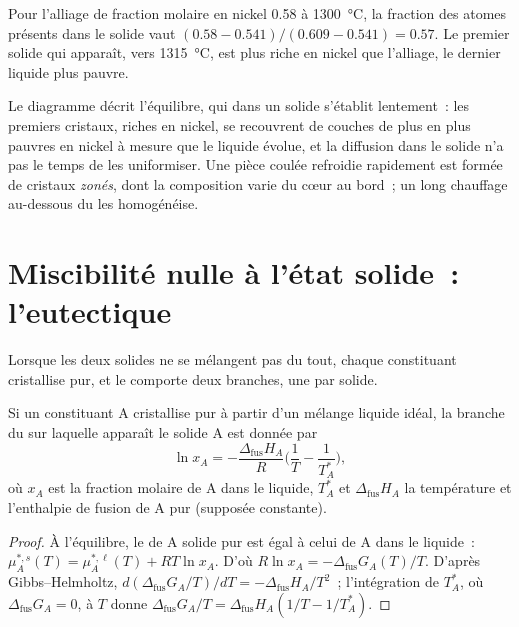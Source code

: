 \begin{example}\label{ex:b2:solid-liquid-diagrams:lever}
Pour l'alliage de fraction molaire en nickel 0.58 à \qty{1300}{\degreeCelsius}, la
fraction des atomes présents dans le solide vaut $(0.58 - 0.541)/(0.609 - 0.541) = 0.57$.
Le premier solide qui apparaît, vers \qty{1315}{\degreeCelsius}, est plus riche en nickel
que l'alliage, le dernier liquide plus pauvre.
\end{example}

Le diagramme décrit l'équilibre, qui dans un solide s'établit lentement~: les premiers cristaux,
riches en nickel, se recouvrent de couches de plus en plus pauvres en nickel à mesure que le liquide
évolue, et la diffusion dans le solide n'a pas le temps de les uniformiser. Une pièce coulée
refroidie rapidement est formée de cristaux \textit{zonés}, dont la composition varie du cœur au
bord~; un long chauffage au-dessous du  les homogénéise.

\section{Miscibilité nulle à l'état solide~: l'eutectique}

Lorsque les deux solides ne se mélangent pas du tout, chaque constituant cristallise pur, et
le  comporte deux branches, une par solide.

\begin{theorem}\label{thm:b2:solid-liquid-diagrams:schroder}
Si un constituant A cristallise pur à partir d'un mélange liquide idéal, la branche du 
sur laquelle apparaît le solide A est donnée par
\[
  \ln x_A = -\frac{\Delta_{\text{fus}}H_A}{R}\Big(\frac1T - \frac1{T_A^*}\Big),
\]
où $x_A$ est la fraction molaire de A dans le liquide, $T_A^*$ et
$\Delta_{\text{fus}}H_A$ la température et l'enthalpie de fusion de A pur
(supposée constante).
\end{theorem}

\begin{proof}
À l'équilibre, le  de A solide pur est égal à celui de A dans le
liquide~: $\mu_A^{*,s}(T) = \mu_A^{*,\ell}(T) + RT\ln x_A$. D'où $R\ln x_A =
-\Delta_{\text{fus}}G_A(T)/T$. D'après Gibbs--Helmholtz, $d(\Delta_{\text{fus}}G_A/T)/
dT = -\Delta_{\text{fus}}H_A/T^2$~; l'intégration de $T_A^*$, où
$\Delta_{\text{fus}}G_A = 0$, à $T$ donne $\Delta_{\text{fus}}G_A/T =
\Delta_{\text{fus}}H_A(1/T - 1/T_A^*)$.
\end{proof}


